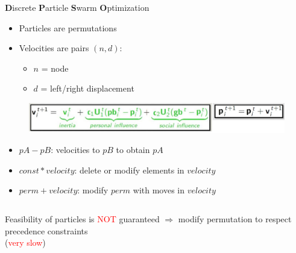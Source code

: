 \documentclass{beamer}
\begin{document}
	\begin{frame}{\textbf{D}iscrete \textbf{P}article \textbf{S}warm \textbf{O}ptimization}
	
		\begin{itemize}
			\item Particles are permutations
			\item Velocities are pairs $ (n, d) $:
				\begin{itemize}
					\item $ n $ = node
					\item $ d $ = left/right displacement
				\end{itemize}
		\end{itemize}
	
		\begin{figure}[H]
			\centering
			\includegraphics[width=\textwidth]{images/dpso_formula_horizontal.png}
		\end{figure}
		
		\begin{itemize}
			\item $ pA - pB $: velocities to $ pB $ to obtain $ pA $
			\item $ const * velocity $: delete or modify elements in $ velocity $
			\item $ perm + velocity $: modify $ perm $ with moves in $ velocity $
		\end{itemize}
		
		\medskip
			
		\begin{columns}
				\centering Feasibility of particles is \textcolor{red}{NOT} guaranteed
				$ \Rightarrow $
				\centering modify permutation to respect precedence constraints \\ (\textcolor{red}{very slow})
		\end{columns}
		
	
	\end{frame}
\end{document}

